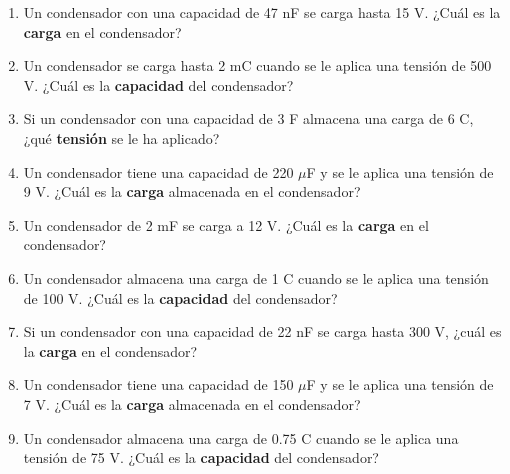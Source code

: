 \documentclass[../main]{subfiles}
\begin{document}
\begin{enumerate}
    \item Un condensador con una capacidad de 47 nF se carga hasta 15 V. ¿Cuál es la \textbf{carga} en el condensador?
    \item Un condensador se carga hasta 2 mC cuando se le aplica una tensión de 500 V. ¿Cuál es la \textbf{capacidad} del condensador?
    \item Si un condensador con una capacidad de 3 F almacena una carga de 6 C, ¿qué \textbf{tensión} se le ha aplicado?
    \item Un condensador tiene una capacidad de 220 $\mu$F y se le aplica una tensión de 9 V. ¿Cuál es la \textbf{carga} almacenada en el condensador?
    \item Un condensador de 2 mF se carga a 12 V. ¿Cuál es la \textbf{carga} en el condensador?
    \item Un condensador almacena una carga de 1 C cuando se le aplica una tensión de 100 V. ¿Cuál es la \textbf{capacidad} del condensador?
    \item Si un condensador con una capacidad de 22 nF se carga hasta 300 V, ¿cuál es la \textbf{carga} en el condensador?
    \item Un condensador tiene una capacidad de 150 $\mu$F y se le aplica una tensión de 7 V. ¿Cuál es la \textbf{carga} almacenada en el condensador?
    \item Un condensador almacena una carga de 0.75 C cuando se le aplica una tensión de 75 V. ¿Cuál es la \textbf{capacidad} del condensador?
\end{enumerate}
\end{document}
